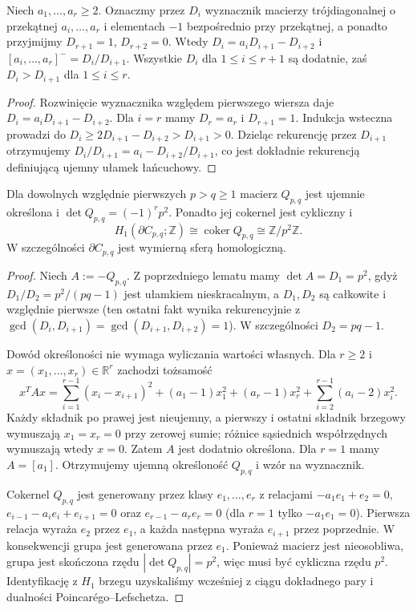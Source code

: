 \begin{lemat}
\label{lem:tg-general-minors}
Niech $a_1,\ldots,a_r\geq2$. Oznaczmy przez $D_i$ wyznacznik
macierzy trójdiagonalnej o przekątnej
$a_i,\ldots,a_r$ i elementach $-1$ bezpośrednio przy przekątnej,
a ponadto przyjmijmy $D_{r+1}=1$, $D_{r+2}=0$. Wtedy
$D_i=a_iD_{i+1}-D_{i+2}$ i
$[a_i,\ldots,a_r]^-=D_i/D_{i+1}$. Wszystkie $D_i$ dla
$1\leq i\leq r+1$ są dodatnie, zaś $D_i>D_{i+1}$ dla
$1\leq i\leq r$.
\end{lemat}

\begin{proof}
Rozwinięcie wyznacznika względem pierwszego wiersza daje
$D_i=a_iD_{i+1}-D_{i+2}$. Dla $i=r$ mamy $D_r=a_r$ i
$D_{r+1}=1$. Indukcja wsteczna prowadzi do
$D_i\geq2D_{i+1}-D_{i+2}>D_{i+1}>0$.
Dzieląc rekurencję przez $D_{i+1}$ otrzymujemy
$D_i/D_{i+1}=a_i-D_{i+2}/D_{i+1}$, co jest dokładnie
rekurencją definiującą ujemny ułamek łańcuchowy.
\end{proof}

\begin{twierdzenie}
\label{thm:tg-general-algebra}
Dla dowolnych względnie pierwszych $p>q\geq1$ macierz
$Q_{p,q}$ jest ujemnie określona i
$\det Q_{p,q}=(-1)^r p^2$.
Ponadto jej cokernel jest cykliczny i
\[
H_1(\partial C_{p,q};\mathbb Z)
\cong\operatorname{coker}Q_{p,q}
\cong\mathbb Z/p^2\mathbb Z.
\]
W szczególności $\partial C_{p,q}$ jest wymierną sferą
homologiczną.
\end{twierdzenie}

\begin{proof}
Niech $A:=-Q_{p,q}$. Z poprzedniego lematu mamy
$\det A=D_1=p^2$, gdyż
$D_1/D_2=p^2/(pq-1)$ jest ułamkiem nieskracalnym,
a $D_1,D_2$ są całkowite i względnie pierwsze
(ten ostatni fakt wynika rekurencyjnie z
$\gcd(D_i,D_{i+1})=\gcd(D_{i+1},D_{i+2})=1$).
W szczególności $D_2=pq-1$.

Dowód określoności nie wymaga wyliczania wartości własnych.
Dla $r\geq2$ i $x=(x_1,\ldots,x_r)\in\mathbb R^r$
zachodzi tożsamość
\[
x^TAx=\sum_{i=1}^{r-1}(x_i-x_{i+1})^2
+(a_1-1)x_1^2+(a_r-1)x_r^2
+\sum_{i=2}^{r-1}(a_i-2)x_i^2.
\]
Każdy składnik po prawej jest nieujemny, a pierwszy i ostatni
składnik brzegowy wymuszają $x_1=x_r=0$ przy zerowej sumie;
różnice sąsiednich współrzędnych wymuszają wtedy $x=0$.
Zatem $A$ jest dodatnio określona. Dla $r=1$ mamy $A=[a_1]$.
Otrzymujemy ujemną określoność $Q_{p,q}$ i wzór na wyznacznik.

Cokernel $Q_{p,q}$ jest generowany przez klasy
$e_1,\ldots,e_r$ z relacjami
$-a_1e_1+e_2=0$, $e_{i-1}-a_ie_i+e_{i+1}=0$
oraz $e_{r-1}-a_re_r=0$ (dla $r=1$ tylko
$-a_1e_1=0$). Pierwsza relacja wyraża $e_2$ przez $e_1$,
a każda następna wyraża $e_{i+1}$ przez poprzednie.
W konsekwencji grupa jest generowana przez $e_1$.
Ponieważ macierz jest nieosobliwa, grupa jest skończona rzędu
$|\det Q_{p,q}|=p^2$, więc musi być cykliczna rzędu $p^2$.
Identyfikację z $H_1$ brzegu uzyskaliśmy wcześniej z
ciągu dokładnego pary i dualności Poincarégo--Lefschetza.
\end{proof}

